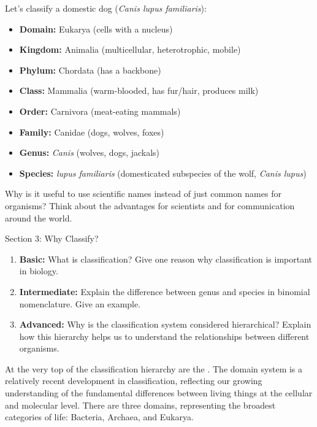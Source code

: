 \begin{example}
Let's classify a domestic dog (\textit{Canis lupus familiaris}):

\begin{itemize}
    \item \textbf{Domain:} Eukarya (cells with a nucleus)
    \item \textbf{Kingdom:} Animalia (multicellular, heterotrophic, mobile)
    \item \textbf{Phylum:} Chordata (has a backbone)
    \item \textbf{Class:} Mammalia (warm-blooded, has fur/hair, produces milk)
    \item \textbf{Order:} Carnivora (meat-eating mammals)
    \item \textbf{Family:} Canidae (dogs, wolves, foxes)
    \item \textbf{Genus:} \textit{Canis} (wolves, dogs, jackals)
    \item \textbf{Species:} \textit{lupus familiaris} (domesticated subspecies of the wolf, \textit{Canis lupus})
\end{itemize}
\end{example}

\begin{stopandthink}
Why is it useful to use scientific names instead of just common names for organisms? Think about the advantages for scientists and for communication around the world.
\end{stopandthink}


\begin{tieredquestions}{Section 3: Why Classify?}
\begin{enumerate}
    \item \textbf{Basic:} What is classification?  Give one reason why classification is important in biology.
    \item \textbf{Intermediate:} Explain the difference between genus and species in binomial nomenclature.  Give an example.
    \item \textbf{Advanced:}  Why is the classification system considered hierarchical? Explain how this hierarchy helps us to understand the relationships between different organisms.
\end{enumerate}
\end{tieredquestions}


\FloatBarrier

At the very top of the classification hierarchy are the .  The domain system is a relatively recent development in classification, reflecting our growing understanding of the fundamental differences between living things at the cellular and molecular level.  There are three domains, representing the broadest categories of life: Bacteria, Archaea, and Eukarya.

